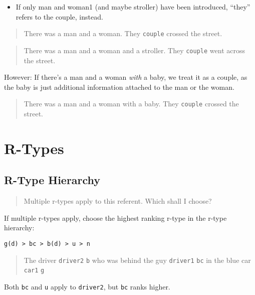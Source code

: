 \documentclass[
]{book}
\providecommand{\tightlist}{%
  \setlength{\itemsep}{0pt}\setlength{\parskip}{0pt}}
\begin{document}
\begin{itemize}
\tightlist
\item
  If only man and woman1 (and maybe stroller) have been introduced,
  ``they'' refers to the couple, instead.
\end{itemize}

\begin{quote}
There was a man and a woman.
They \texttt{couple} crossed the street.
\end{quote}

\begin{quote}
There was a man and a woman and a stroller.
They \texttt{couple} went across the street.
\end{quote}

However: If there's a man and a woman \emph{with} a baby,
we treat it as a couple,
as the baby is just additional information
attached to the man or the woman.

\begin{quote}
There was a man and a woman with a baby.
They \texttt{couple} crossed the street.
\end{quote}

\hypertarget{r-types}{%
\section{R-Types}\label{r-types}}

\hypertarget{r-type-hierarchy}{%
\subsection{R-Type Hierarchy}\label{r-type-hierarchy}}

\begin{quote}
Multiple r-types apply to this referent. Which shall I choose?
\end{quote}

If multiple r-types apply,
choose the highest ranking r-type in the r-type hierarchy:

\texttt{g(d)\ \textgreater{}\ bc\ \textgreater{}\ b(d)\ \textgreater{}\ u\ \textgreater{}\ n}

\begin{quote}
The driver \texttt{driver2} \texttt{b} who was behind the guy \texttt{driver1} \texttt{bc}
in the blue car \texttt{car1} \texttt{g}
\end{quote}

Both \texttt{bc} and \texttt{u} apply to \texttt{driver2}, but \texttt{bc} ranks higher.
\end{document}
